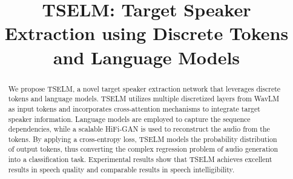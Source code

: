 \documentclass[conference]{IEEEtran}
\begin{document}
\title{TSELM: Target Speaker Extraction using Discrete Tokens and Language Models
}

\author{
\and
{}
\and
{}
}

\maketitle

\begin{abstract}
  We propose TSELM, a novel target speaker extraction network that leverages discrete tokens and language models. TSELM utilizes multiple discretized layers from WavLM as input tokens and incorporates cross-attention mechanisms to integrate target speaker information. Language models are employed to capture the sequence dependencies, while a scalable HiFi-GAN is used to reconstruct the audio from the tokens. By applying a cross-entropy loss, TSELM models the probability distribution of output tokens, thus converting the complex regression problem of audio generation into a classification task.
  Experimental results show that TSELM achieves excellent results in speech 
  quality and comparable results in speech intelligibility. 
\end{abstract}
\end{document}
